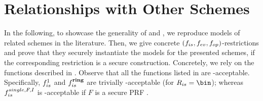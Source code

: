 \section{Relationships with Other Schemes}
\label{sec:relationships}


In the following, to showcase the generality of \UAS and \CUASGen, we reproduce
models of related schemes in the literature.
Then, we give concrete $(f_{is},f_{ev},f_{op})$-\CUASGen restrictions and prove
that they securely instantiate the models for the presented schemes, if the
corresponding \CUASGen restriction is a secure \UAS construction. Concretely,
we rely on the functions described in . Observe
that all the \fissue functions listed in  are
\UAS-acceptable. Specifically, $f_{is}^1$ and $f_{is}^{\mathbf{ring}}$ are trivially
\UAS-acceptable (for $\rngfissue = \bin$); whereas $f_{is}^{single,F,I}$ is
\UAS-acceptable if $F$ is a secure PRF \needcite.


